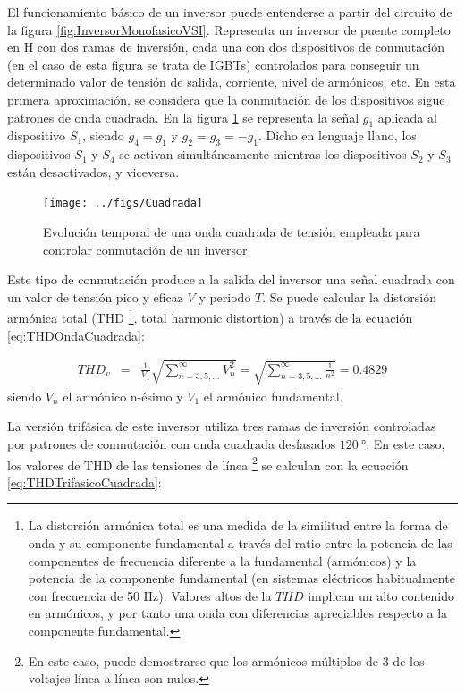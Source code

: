 El funcionamiento básico de un inversor puede entenderse a partir
del circuito de la figura \ref{fig:InversorMonofasicoVSI}. Representa
un inversor de puente completo en H con dos ramas de inversión, cada
una con dos dispositivos de conmutación (en el caso de esta figura
se trata de IGBTs) controlados para conseguir un determinado valor
de tensión de salida, corriente, nivel de armónicos, etc. En esta
primera aproximación, se considera que la conmutación de los dispositivos
sigue patrones de onda cuadrada. En la figura \ref{fig:Onda-cuadrada}
se representa la señal $g_{1}$ aplicada al dispositivo $S_{1}$,
siendo $g_{4}=g_{1}$ y $g_{2}=g_{3}=-g_{1}$. Dicho en lenguaje llano,
los dispositivos $S_{1}$ y $S_{4}$ se activan simultáneamente mientras
los dispositivos $S_{2}$ y $S_{3}$ están desactivados, y viceversa.

%
\begin{figure}
\texttt{[image: ../figs/Cuadrada]}

\caption{Evolución temporal de una onda cuadrada de tensión empleada para controlar
conmutación de un inversor.\label{fig:Onda-cuadrada}}

\end{figure}


Este tipo de conmutación produce a la salida del inversor una señal
cuadrada con un valor de tensión pico y eficaz $V$ y periodo $T$.
Se puede calcular la distorsión armónica total (THD%
\footnote{La distorsión armónica total es una medida de la similitud entre la
forma de onda y su componente fundamental a través del ratio entre
la potencia de las componentes de frecuencia diferente a la fundamental
(armónicos) y la potencia de la componente fundamental (en sistemas
eléctricos habitualmente con frecuencia de 50 Hz). Valores altos de
la $THD$ implican un alto contenido en armónicos, y por tanto una
onda con diferencias apreciables respecto a la componente fundamental.%
}, total harmonic distortion) a través de la ecuación \ref{eq:THDOndaCuadrada}:

\begin{eqnarray}
THD_{v} & = & \frac{1}{V_{1}}\sqrt{\sum_{n=3,5,...}^{\infty}V_{n}^{2}}=\sqrt{\sum_{n=3,5,...}^{\infty}\frac{1}{n^{2}}}=0.4829\label{eq:THDOndaCuadrada}\end{eqnarray}
siendo $V_{n}$ el armónico n-ésimo y $V_{1}$ el armónico fundamental. 

La versión trifásica de este inversor utiliza tres ramas de inversión
controladas por patrones de conmutación con onda cuadrada desfasados
$\SI{120}{\degree}$. En este caso, los valores de THD de las tensiones
de línea%
\footnote{En este caso, puede demostrarse que los armónicos múltiplos de 3 de
los voltajes línea a línea son nulos.%
} se calculan con la ecuación \ref{eq:THDTrifasicoCuadrada}:

